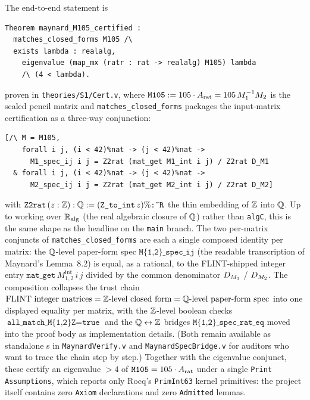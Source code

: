 The end-to-end statement is
\begin{verbatim}
Theorem maynard_M105_certified :
  matches_closed_forms M105 /\
  exists lambda : realalg,
    eigenvalue (map_mx (ratr : rat -> realalg) M105) lambda
    /\ (4 < lambda).
\end{verbatim}
proven in \texttt{theories/S1/Cert.v}, where
$\texttt{M105} := 105 \cdot A_{\mathrm{rat}} = 105\,M_1^{-1}M_2$ is the scaled
pencil matrix and \texttt{matches\_closed\_forms} packages the
input-matrix certification as a three-way conjunction:
\begin{verbatim}
[/\ M = M105,
    forall i j, (i < 42)%nat -> (j < 42)%nat ->
      M1_spec_ij i j = Z2rat (mat_get M1_int i j) / Z2rat D_M1
  & forall i j, (i < 42)%nat -> (j < 42)%nat ->
      M2_spec_ij i j = Z2rat (mat_get M2_int i j) / Z2rat D_M2]
\end{verbatim}
with
$\texttt{Z2rat}\,(z : \mathbb{Z}) : \mathbb{Q} := (\texttt{Z\_to\_int}\,z)\%\texttt{:\~{}R}$
the thin embedding of $\mathbb{Z}$ into $\mathbb{Q}$. Up to working over $\mathbb{R}_{\mathrm{alg}}$
(the real algebraic closure of $\mathbb{Q}$) rather than \texttt{algC}, this is
the same shape as the headline on the \texttt{main} branch. The two
per-matrix conjuncts of \texttt{matches\_closed\_forms} are
each a single composed identity per matrix: the $\mathbb{Q}$-level paper-form
spec $\texttt{M\{1,2\}\_spec\_ij}$ (the readable transcription of
Maynard's Lemma~8.2) is equal, as a rational, to the FLINT-shipped
integer entry $\texttt{mat\_get}\,M_{1,2}^{\mathrm{int}}\,i\,j$ divided
by the common denominator $D_{M_1}$ / $D_{M_2}$. The composition collapses
the trust chain
$\text{FLINT integer matrices} = \text{$\mathbb{Z}$-level closed form}
 = \text{$\mathbb{Q}$-level paper-form spec}$
into one displayed equality per matrix, with the $\mathbb{Z}$-level boolean
checks $\texttt{all\_match\_M\{1,2\}Z} = \texttt{true}$ and the
$\mathbb{Q}\leftrightarrow\mathbb{Z}$ bridges $\texttt{M\{1,2\}\_spec\_rat\_eq}$
moved into the proof body as implementation details. (Both remain
available as standalone \Qed{}s in \texttt{MaynardVerify.v} and
\texttt{MaynardSpecBridge.v} for auditors who want to trace the chain
step by step.) Together with the eigenvalue conjunct, these certify an
eigenvalue $> 4$ of $\texttt{M105} = 105\cdot A_{\mathrm{rat}}$ under a single
\texttt{Print Assumptions},
which reports only Rocq's \texttt{PrimInt63} kernel primitives: the
project itself contains zero \texttt{Axiom} declarations and zero
\texttt{Admitted} lemmas.

